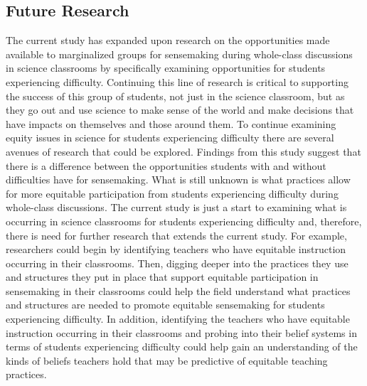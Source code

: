\documentclass{sig-alternate} %
\begin{document}
\begin{large}
\subsection*{Future Research}

The current study has expanded upon research on the opportunities made available to marginalized groups for sensemaking during whole-class discussions in science classrooms by specifically examining opportunities for students experiencing difficulty. Continuing this line of research is critical to supporting the success of this group of students, not just in the science classroom, but as they go out and use science to make sense of the world and make decisions that have impacts on themselves and those around them. To continue examining equity issues in science for students experiencing difficulty there are several avenues of research that could be explored. 
Findings from this study suggest that there is a difference between the opportunities students with and without difficulties have for sensemaking. What is still unknown is what practices allow for more equitable participation from students experiencing difficulty during whole-class discussions. The current study is just a start to examining what is occurring in science classrooms for students experiencing difficulty and, therefore, there is need for further research that extends the current study. For example, researchers could begin by identifying teachers who have equitable instruction occurring in their classrooms. Then, digging deeper into the practices they use and structures they put in place that support equitable participation in sensemaking in their classrooms could help the field understand what practices and structures are needed to promote equitable sensemaking for students experiencing difficulty. In addition, identifying the teachers who have equitable instruction occurring in their classrooms and probing into their belief systems in terms of students experiencing difficulty could help gain an understanding of the kinds of beliefs teachers hold that may be predictive of equitable teaching practices. 


\end{large}
\end{document}
